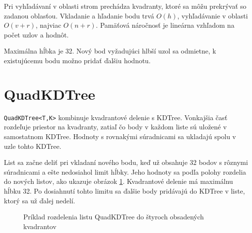 \documentclass[12pt,a4paper,oneside]{report}
\begin{document}
Pri vyhľadávaní v oblasti strom prechádza kvadranty, ktoré sa môžu
prekrývať so zadanou oblasťou. Vkladanie a hľadanie bodu trvá \(O(h)\),
vyhľadávanie v oblasti \(O(v+r)\), najviac \(O(n+r)\). Pamäťová
náročnosť je lineárna vzhľadom na počet uzlov a hodnôt.

Maximálna hĺbka je 32. Nový bod vyžadujúci hlbší uzol sa odmietne,
k existujúcemu bodu možno pridať ďalšiu hodnotu.

\section{QuadKDTree}
\texttt{QuadKDTree<T,K>} kombinuje kvadrantové delenie s KDTree.
Vonkajšia časť rozdeľuje priestor na kvadranty, zatiaľ čo body v každom
liste sú uložené v samostatnom KDTree. Hodnoty s rovnakými súradnicami
sa ukladajú spolu v uzle tohto KDTree.

List sa začne deliť pri vkladaní nového bodu, keď už obsahuje 32 bodov
s rôznymi súradnicami a ešte nedosiahol limit hĺbky. Jeho hodnoty sa
podľa polohy rozdelia do nových listov, ako ukazuje obrázok
\ref{fig:quadkd-split}. Kvadrantové delenie má maximálnu hĺbku 32.
Po dosiahnutí tohto limitu sa ďalšie body pridávajú do KDTree v liste,
ktorý sa už ďalej nedelí.

\begin{figure}[H]
\centering
{}
\caption{Príklad rozdelenia listu QuadKDTree do štyroch obsadených kvadrantov}
\label{fig:quadkd-split}
\end{figure}
\end{document}
